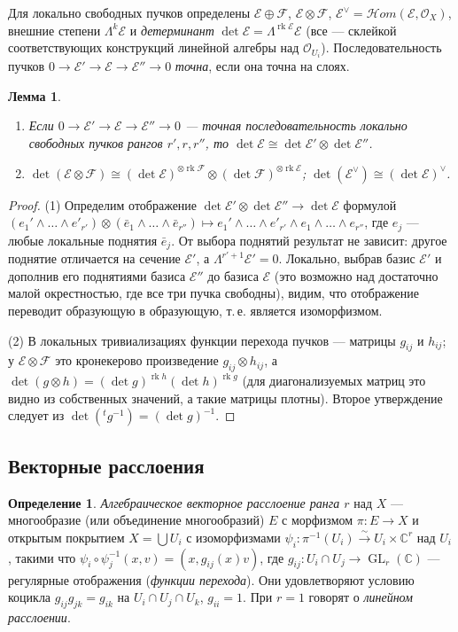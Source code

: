 \documentclass[11pt,a4paper]{article}
\theoremstyle{plain}
\newtheorem{lemma}[theorem]{Лемма}
\theoremstyle{definition}
\newtheorem{definition}[theorem]{Определение}
\theoremstyle{remark}
\renewcommand{\C}{\mathbb{C}}
\newcommand{\cO}{\mathcal{O}}
\newcommand{\cE}{\mathcal{E}}
\newcommand{\cF}{\mathcal{F}}
\DeclareMathOperator{\rk}{rk}
\DeclareMathOperator{\GL}{GL}
\begin{document}
Для локально свободных пучков определены $\cE\oplus\cF$, $\cE\otimes\cF$,
$\cE^\vee=\mathcal{H}om(\cE,\cO_X)$, внешние степени $\Lambda^k\cE$ и
\emph{детерминант} $\det\cE=\Lambda^{\rk \cE}\cE$ (все --- склейкой соответствующих конструкций
линейной алгебры над $\cO_{U_i}$). Последовательность пучков $0\to\cE'\to\cE\to\cE''\to0$
\emph{точна}, если она точна на слоях.

\begin{lemma}\label{lem:det}
\begin{enumerate}
\item Если $0\to\cE'\to\cE\to\cE''\to0$ --- точная последовательность локально свободных пучков
рангов $r',r,r''$, то $\det \cE\cong\det\cE'\otimes\det\cE''$.
\item $\det(\cE\otimes\cF)\cong(\det\cE)^{\otimes\rk\cF}\otimes(\det\cF)^{\otimes\rk\cE}$;
$\det(\cE^\vee)\cong(\det\cE)^\vee$.
\end{enumerate}
\end{lemma}
\begin{proof}
(1) Определим отображение $\det\cE'\otimes\det\cE''\to\det\cE$ формулой
$(e_1'\wedge\dots\wedge e'_{r'})\otimes(\bar e_1\wedge\dots\wedge\bar e_{r''})\mapsto
e_1'\wedge\dots\wedge e'_{r'}\wedge e_1\wedge\dots\wedge e_{r''}$, где $e_j$ --- любые
локальные поднятия $\bar e_j$. От выбора поднятий результат не зависит: другое поднятие отличается
на сечение $\cE'$, а $\Lambda^{r'+1}\cE'=0$. Локально, выбрав базис $\cE'$ и дополнив его
поднятиями базиса $\cE''$ до базиса $\cE$ (это возможно над достаточно малой окрестностью, где
все три пучка свободны), видим, что отображение переводит образующую в образующую, т.\,е.
является изоморфизмом.

(2) В локальных тривиализациях функции перехода пучков --- матрицы $g_{ij}$ и $h_{ij}$; у
$\cE\otimes\cF$ это кронекерово произведение $g_{ij}\otimes h_{ij}$, а
$\det(g\otimes h)=(\det g)^{\rk h}(\det h)^{\rk g}$ (для диагонализуемых матриц это видно из
собственных значений, а такие матрицы плотны). Второе утверждение следует из
$\det({}^tg^{-1})=(\det g)^{-1}$.
\end{proof}

\subsection{Векторные расслоения}\label{ss:bundles}

\begin{definition}
\emph{Алгебраическое векторное расслоение ранга $r$} над $X$ --- многообразие (или объединение
многообразий) $E$ с морфизмом $\pi\colon E\to X$ и открытым покрытием $X=\bigcup U_i$ с
изоморфизмами $\psi_i\colon \pi^{-1}(U_i)\xrightarrow{\sim} U_i\times\C^r$ над $U_i$, такими что
$\psi_i\circ\psi_j^{-1}(x,v)=(x,g_{ij}(x)v)$, где $g_{ij}\colon U_i\cap U_j\to\GL_r(\C)$ ---
регулярные отображения (\emph{функции перехода}). Они удовлетворяют условию коцикла
$g_{ij}g_{jk}=g_{ik}$ на $U_i\cap U_j\cap U_k$, $g_{ii}=1$. При $r=1$ говорят о
\emph{линейном расслоении}.
\end{definition}
\end{document}
